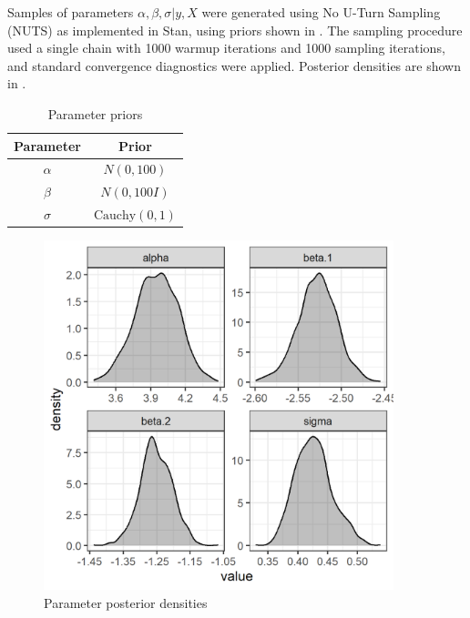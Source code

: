 \documentclass{article}
\begin{document}
Samples of parameters $\alpha, \beta, \sigma | y, X$ were generated using No U-Turn Sampling (NUTS) as implemented in Stan, using priors shown in . The sampling procedure used a single chain with 1000 warmup iterations and 1000 sampling iterations, and standard convergence diagnostics were applied. Posterior densities are shown in .
\begin{table}
\centering
\begin{tabular}{|c|c|}
	\hline
	\textbf{Parameter} & \textbf{Prior} \\ \hline
	$\alpha$ & $N(0, 100)$ \\ \hline
	$\beta$ & $N(0, 100I)$ \\ \hline
	$\sigma$ & $\mbox{Cauchy}(0, 1)$ \\ \hline
\end{tabular}
\caption{Parameter priors}
\label{tab:lm-normal-priors}
\end{table}
\begin{figure}
	\centering
	\includegraphics[width=4in]{../examples/lm-normal-fixed/images/density-posterior-forward.png}
	\caption{Parameter posterior densities}
	\label{fig:lm-normal-posterior-forward}
\end{figure}
\end{document}
